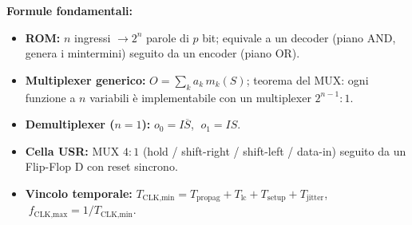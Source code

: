 \begin{note}
\textbf{Formule fondamentali:}
\begin{itemize}
    \item \textbf{ROM:} $n$ ingressi $\to 2^n$ parole di $p$ bit; equivale a un decoder (piano AND, genera i mintermini) seguito da un encoder (piano OR).
    \item \textbf{Multiplexer generico:} $O = \sum_k a_k\, m_k(S)$; teorema del MUX: ogni funzione a $n$ variabili è implementabile con un multiplexer $2^{n-1}{:}1$.
    \item \textbf{Demultiplexer ($n=1$):} $o_0 = I\overline{S}$, $\; o_1 = IS$.
    \item \textbf{Cella USR:} MUX $4{:}1$ (hold / shift-right / shift-left / data-in) seguito da un Flip-Flop D con reset sincrono.
    \item \textbf{Vincolo temporale:} $T_{\text{CLK,min}} = T_{\text{propag}} + T_{\text{lc}} + T_{\text{setup}} + T_{\text{jitter}}$, $\; f_{\text{CLK,max}} = 1/T_{\text{CLK,min}}$.
\end{itemize}
\end{note}

